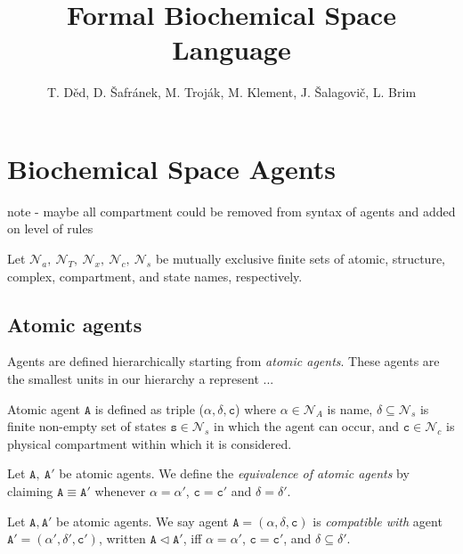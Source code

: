 \documentclass{entcs}
\renewcommand{\~}[0]{\texttildelow}
\begin{document}
\begin{frontmatter}
\title{Formal Biochemical Space Language}

\author{\normalsize
T. D\v{e}d, D. \v{S}afr\'anek, M. Troj\'ak, M. Klement, J. \v{S}alagovi\v{c}, L. Brim}
\address{Faculty of Informatics, Masaryk University\\
Brno, Czech Republic
}

\end{frontmatter}

\section{Biochemical Space Agents}

note - maybe all compartment could be removed from syntax of agents and added on level of rules

Let $\mathcal{N}_{a},~\mathcal{N}_{T},~\mathcal{N}_{x},~\mathcal{N}_{c},~\mathcal{N}_{s}$ be mutually exclusive finite sets of atomic, structure, complex, compartment, and state names, respectively. 

\subsection{Atomic agents}

Agents are defined hierarchically starting from \emph{atomic agents}. These agents are the smallest units in our hierarchy a represent ...

\begin{definition}
Atomic agent $\mathtt{A}$ is defined as triple ($\alpha, \delta, \mathtt{c}$) where $\alpha \in \mathcal{N}_{A}$ is name, $\delta \subseteq \mathcal{N}_{s}$ is finite non-empty set of states $\mathtt{s} \in \mathcal{N}_{s}$ in which the agent can occur, and $\mathtt{c} \in \mathcal{N}_{c}$ is physical compartment within which it is considered.
\end{definition}

\begin{definition}
Let $\mathtt{A},~\mathtt{A}'$ be atomic agents. We define the \emph{equivalence of atomic agents} by claiming $\mathtt{A}\equiv\mathtt{A}'$ whenever $\mathtt{\alpha} = \mathtt{\alpha}'$, $\mathtt{c} = \mathtt{c}'$ and $\delta = \delta'$.
\end{definition}

\begin{defn}
Let $\mathtt{A},\mathtt{A}'$ be atomic agents. We say agent $\mathtt{A}=(\alpha, \delta, \mathtt{c})$ is \emph{compatible with} agent $\mathtt{A}'=(\alpha', \delta', \mathtt{c}')$, written $\mathtt{A} \lhd \mathtt{A}'$, iff $\alpha = \alpha'$, $\mathtt{c} = \mathtt{c}'$, and $\delta \subseteq \delta'$. 
\end{defn}
\end{document}
